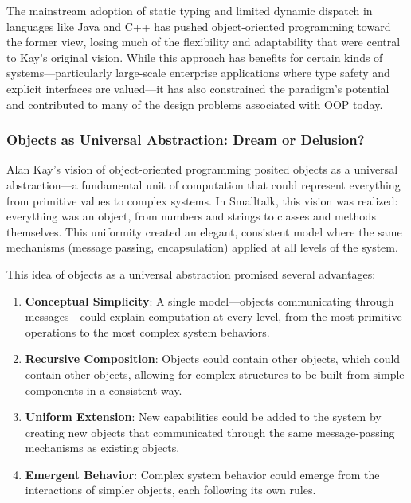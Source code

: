 \documentclass[11pt]{article}
\begin{document}
The mainstream adoption of static typing and limited dynamic dispatch in languages like Java and C++ has pushed object-oriented programming toward the former view, losing much of the flexibility and adaptability that were central to Kay's original vision. While this approach has benefits for certain kinds of systems—particularly large-scale enterprise applications where type safety and explicit interfaces are valued—it has also constrained the paradigm's potential and contributed to many of the design problems associated with OOP today.
\subsubsection{Objects as Universal Abstraction: Dream or Delusion?}
\label{sec:orga6a0369}

Alan Kay's vision of object-oriented programming posited objects as a universal abstraction—a fundamental unit of computation that could represent everything from primitive values to complex systems. In Smalltalk, this vision was realized: everything was an object, from numbers and strings to classes and methods themselves. This uniformity created an elegant, consistent model where the same mechanisms (message passing, encapsulation) applied at all levels of the system.

This idea of objects as a universal abstraction promised several advantages:

\begin{enumerate}
\item \textbf{Conceptual Simplicity}: A single model—objects communicating through messages—could explain computation at every level, from the most primitive operations to the most complex system behaviors.

\item \textbf{Recursive Composition}: Objects could contain other objects, which could contain other objects, allowing for complex structures to be built from simple components in a consistent way.

\item \textbf{Uniform Extension}: New capabilities could be added to the system by creating new objects that communicated through the same message-passing mechanisms as existing objects.

\item \textbf{Emergent Behavior}: Complex system behavior could emerge from the interactions of simpler objects, each following its own rules.
\end{enumerate}
\end{document}
